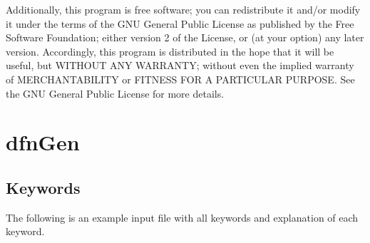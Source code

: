 \documentclass[letterpaper,10pt,english]{sphinxmanual}
\begin{document}
Additionally, this program is free software; you can redistribute it and/or modify it under the terms of the GNU General Public License as published by the Free Software Foundation; either version 2 of the License, or (at your option) any later version. Accordingly, this program is distributed in the hope that it will be useful, but WITHOUT ANY WARRANTY; without even the implied warranty of MERCHANTABILITY or FITNESS FOR A PARTICULAR PURPOSE. See the GNU General Public License for more details.


\chapter{dfnGen}
\label{dfngen:dfngen-chapter}\label{dfngen:dfngen}\label{dfngen::doc}

\section{Keywords}
\label{dfngen:keywords}
The following is an example input file with all keywords and
explanation of each keyword.
\end{document}
